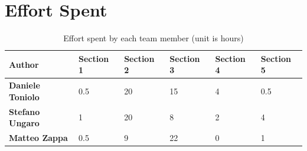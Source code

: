 \chapter{Effort Spent}
\begin{table}[ht]
    \sf
    \small
    \centering
    \renewcommand{\arraystretch}{1.5}
    \begin{tabularx}{\textwidth}{|X|X|X|X|X|X|}
        \hline
        \rowcolor{lightgray} Author & Section 1 & Section 2 & Section 3 & Section 4 & Section 5 \\
        \hline
        \textbf{Daniele Toniolo} & 0.5 & 20 & 15 & 4 & 0.5\\
        \textbf{Stefano Ungaro} & 1 & 20 & 8 & 2 & 4\\
        \textbf{Matteo Zappa} & 0.5 & 9 & 22 & 0 & 1\\
        \hline
    \end{tabularx}
    \caption{Effort spent by each team member (unit is hours)}
\end{table}